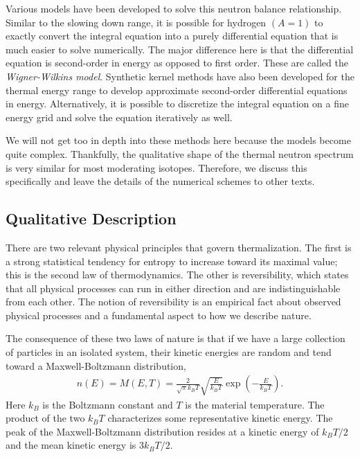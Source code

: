 Various models have been developed to solve this neutron balance relationship. Similar to the slowing down range, it is possible for hydrogen $(A = 1)$ to exactly convert the integral equation into a purely differential equation that is much easier to solve numerically. The major difference here is that the differential equation is second-order in energy as opposed to first order. These are called the \emph{Wigner-Wilkins model}. Synthetic kernel methods have also been developed for the thermal energy range to develop approximate second-order differential equations in energy. Alternatively, it is possible to discretize the integral equation on a fine energy grid and solve the equation iteratively as well.

We will not get too in depth into these methods here because the models become quite complex. Thankfully, the qualitative shape of the thermal neutron spectrum is very similar for most moderating isotopes. Therefore, we discuss this specifically and leave the details of the numerical schemes to other texts.

\subsection{Qualitative Description}

There are two relevant physical principles that govern thermalization. The first is a strong statistical tendency for entropy to increase toward its maximal value; this is the second law of thermodynamics. The other is reversibility, which states that all physical processes can run in either direction and are indistinguishable from each other. The notion of reversibility is an empirical fact about observed physical processes and a fundamental aspect to how we describe nature. 

The consequence of these two laws of nature is that if we have a large collection of particles in an isolated system, their kinetic energies are random and tend toward a Maxwell-Boltzmann distribution,
\begin{align}
  n(E) = M(E,T) = \frac{2}{\sqrt{\pi} k_B T} \sqrt{ \frac{ E }{ k_B T } } \exp\left( -\frac{E}{k_B T} \right) .
\end{align}
Here $k_B$ is the Boltzmann constant and $T$ is the material temperature. The product of the two $k_B T$ characterizes some representative kinetic energy. The peak of the Maxwell-Boltzmann distribution resides at a kinetic energy of $k_B T/2$ and the mean kinetic energy is $3 k_B T / 2$.

